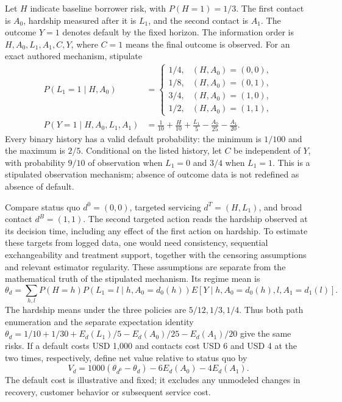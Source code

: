 Let $H$ indicate baseline borrower risk, with $P(H=1)=1/3$. The first contact
is $A_0$, hardship measured after it is $L_1$, and the second contact is $A_1$.
The outcome $Y=1$ denotes default by the fixed horizon. The information order
is $H,A_0,L_1,A_1,C,Y$, where $C=1$ means the final outcome is observed.
For an exact authored mechanism, stipulate
\begin{align}
 P(L_1=1\mid H,A_0)
 &=\begin{cases}
 1/4,&(H,A_0)=(0,0),\\
 1/8,&(H,A_0)=(0,1),\\
 3/4,&(H,A_0)=(1,0),\\
 1/2,&(H,A_0)=(1,1),
 \end{cases}\label{exec23:ltmle-hardship}\\
 P(Y=1\mid H,A_0,L_1,A_1)
 &=\frac1{10}+\frac H{10}+\frac{L_1}{5}
       -\frac{A_0}{25}-\frac{A_1}{20}.
 \label{exec23:ltmle-default}
\end{align}
Every binary history has a valid default probability: the minimum is $1/100$
and the maximum is $2/5$. Conditional on the listed history, let $C$ be
independent of $Y$, with probability $9/10$ of observation when $L_1=0$ and
$3/4$ when $L_1=1$. This is a stipulated observation mechanism; absence of
outcome data is not redefined as absence of default.

Compare status quo $d^0=(0,0)$, targeted servicing
$d^T=(H,L_1)$, and broad contact $d^B=(1,1)$. The second targeted action reads
the hardship observed at its decision time, including any effect of the first
action on hardship. To estimate these targets from logged data, one would need
consistency, sequential exchangeability and treatment support, together with
the censoring assumptions and relevant estimator regularity. These assumptions
are separate from the mathematical truth of the stipulated mechanism.
Its regime mean is
\begin{equation}
 \theta_d=\sum_{h,l}P(H=h)P(L_1=l\mid h,A_0=d_0(h))
 E[Y\mid h,A_0=d_0(h),l,A_1=d_1(l)].
 \label{exec23:ltmle-gformula}
\end{equation}
The hardship means under the three policies are $5/12,1/3,1/4$.
Thus both path enumeration and the separate expectation identity
$\theta_d=1/10+1/30+E_d(L_1)/5-E_d(A_0)/25-E_d(A_1)/20$
give the same risks. If a default costs USD 1,000 and contacts cost USD 6
and USD 4 at the two times, respectively, define net value relative to status quo by
\begin{equation}
 V_d=1000(\theta_{d^0}-\theta_d)-6E_d(A_0)-4E_d(A_1).
 \label{exec23:ltmle-value}
\end{equation}
The default cost is illustrative and fixed; it excludes any unmodeled changes
in recovery, customer behavior or subsequent service cost.

